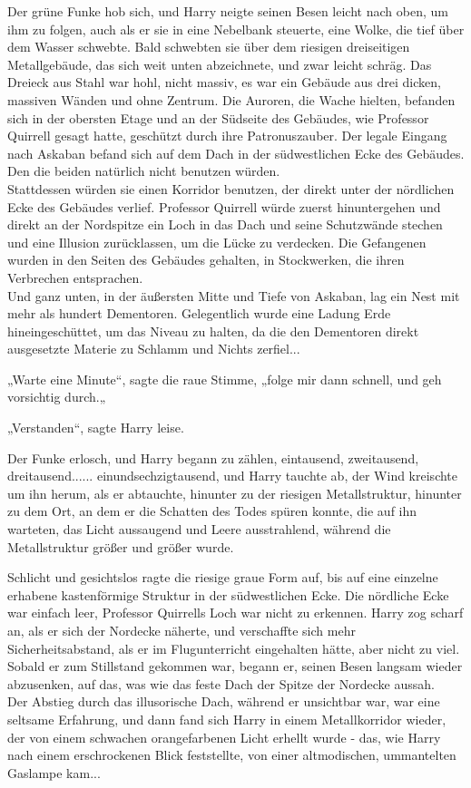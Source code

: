 {Der grüne Funke hob sich, und Harry neigte seinen Besen leicht nach oben, um ihm zu folgen, auch als er sie in eine Nebelbank steuerte, eine Wolke, die tief über dem Wasser schwebte. Bald schwebten sie über dem riesigen dreiseitigen Metallgebäude, das sich weit unten abzeichnete, und zwar leicht schräg. Das Dreieck aus Stahl war hohl, nicht massiv, es war ein Gebäude aus drei dicken, massiven Wänden und ohne Zentrum. Die Auroren, die Wache hielten, befanden sich in der obersten Etage und an der Südseite des Gebäudes, wie Professor Quirrell gesagt hatte, geschützt durch ihre Patronuszauber. Der legale Eingang nach Askaban befand sich auf dem Dach in der südwestlichen Ecke des Gebäudes. Den die beiden natürlich nicht benutzen würden.\\ Stattdessen würden sie einen Korridor benutzen, der direkt unter der nördlichen Ecke des Gebäudes verlief. Professor Quirrell würde zuerst hinuntergehen und direkt an der Nordspitze ein Loch in das Dach und seine Schutzwände stechen und eine Illusion zurücklassen, um die Lücke zu verdecken. Die Gefangenen wurden in den Seiten des Gebäudes gehalten, in Stockwerken, die ihren Verbrechen entsprachen.\\ Und ganz unten, in der äußersten Mitte und Tiefe von Askaban, lag ein Nest mit mehr als hundert Dementoren. Gelegentlich wurde eine Ladung Erde hineingeschüttet, um das Niveau zu halten, da die den Dementoren direkt ausgesetzte Materie zu Schlamm und Nichts zerfiel...

„Warte eine Minute“, sagte die raue Stimme, „folge mir dann schnell, und geh vorsichtig durch.„

„Verstanden“, sagte Harry leise.

Der Funke erlosch, und Harry begann zu zählen, eintausend, zweitausend, dreitausend...... einundsechzigtausend, und Harry tauchte ab, der Wind kreischte um ihn herum, als er abtauchte, hinunter zu der riesigen Metallstruktur, hinunter zu dem Ort, an dem er die Schatten des Todes spüren konnte, die auf ihn warteten, das Licht aussaugend und Leere ausstrahlend, während die Metallstruktur größer und größer wurde.

Schlicht und gesichtslos ragte die riesige graue Form auf, bis auf eine einzelne erhabene kastenförmige Struktur in der südwestlichen Ecke. Die nördliche Ecke war einfach leer, Professor Quirrells Loch war nicht zu erkennen. Harry zog scharf an, als er sich der Nordecke näherte, und verschaffte sich mehr Sicherheitsabstand, als er im Flugunterricht eingehalten hätte, aber nicht zu viel. Sobald er zum Stillstand gekommen war, begann er, seinen Besen langsam wieder abzusenken, auf das, was wie das feste Dach der Spitze der Nordecke aussah.\\ Der Abstieg durch das illusorische Dach, während er unsichtbar war, war eine seltsame Erfahrung, und dann fand sich Harry in einem Metallkorridor wieder, der von einem schwachen orangefarbenen Licht erhellt wurde - das, wie Harry nach einem erschrockenen Blick feststellte, von einer altmodischen, ummantelten Gaslampe kam...

}
